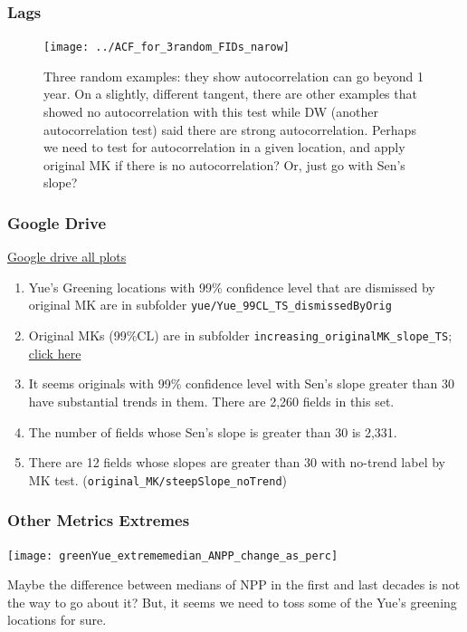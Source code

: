 \documentclass[serif, xcolor={dvipsnames}]{beamer} %
\def\code#1{{\scriptsize\texttt{#1}}}
\begin{document}
\begin{frame}
\frametitle{Lags}

\begin{figure}[H]
\centering
\texttt{[image: ../ACF\_for\_3random\_FIDs\_narow]}
\captionsetup{singlelinecheck=false} 
\caption*{Three random examples: they show autocorrelation can go beyond 1 year. 
On a slightly, different tangent, there are other examples that showed 
no autocorrelation with this test 
while DW (another autocorrelation test) said there are strong autocorrelation.
Perhaps we need to test for autocorrelation in a given location,
and apply original MK if there is no autocorrelation? Or, just go with Sen's slope?}
\label{fig:ACF_for_3random_FIDs_narow}
\end{figure}
\end{frame}
\begin{frame}[t]
\frametitle{Google Drive}
\href{https://tinyurl.com/5n76ppzs}{Google drive all plots}

\begin{enumerate}
\item Yue's Greening locations with 99\% confidence level that are dismissed by original MK
are in subfolder \code{yue/Yue\_99CL\_TS\_dismissedByOrig} 

\item Original MKs (99\%CL) are in
subfolder \code{increasing\_originalMK\_slope\_TS}; \href{https://drive.google.com/drive/folders/197H1-FCRkS0gAqGr1DDreCU5n4NMWCwG?usp=share_link}{click here}

\item It seems originals with 99\% confidence level with Sen's slope greater than
30 have substantial trends in them. There are 2,260 fields in this set.

\item The number of fields whose Sen's slope is greater than 30 is 2,331.\\

\item There are 12 fields whose slopes are greater than 30 with no-trend label by MK test. (\code{original\_MK/steepSlope\_noTrend})


\end{enumerate}

\end{frame}
\begin{frame}
\frametitle{Other Metrics Extremes}
\begin{center}
\texttt{[image: greenYue\_extrememedian\_ANPP\_change\_as\_perc]}
\end{center}
\vspace{-.2in}
{\scriptsize Maybe the difference between medians of NPP in the first and last decades is not the way to go about it?
But, it seems we need to toss some of the Yue's greening locations for sure.}
\end{frame}
\end{document}
